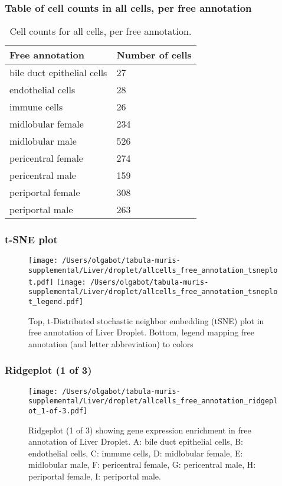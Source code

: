 \subsubsection{Table of cell counts in all cells, per free annotation}\begin{table}[h]
\centering
\label{my-label}
\begin{tabular}{@{}ll@{}}
\toprule

Free annotation& Number of cells \\ \midrule
bile duct epithelial cells & 27 \\

endothelial cells & 28 \\

immune cells & 26 \\

midlobular female & 234 \\

midlobular male & 526 \\

pericentral female & 274 \\

pericentral male & 159 \\

periportal female & 308 \\

periportal male & 263 \\
\bottomrule
\end{tabular}
\caption{Cell counts for all cells, per free annotation.}
\end{table}

\clearpage
\subsubsection{t-SNE plot}
\begin{figure}[h]
\centering
\texttt{[image: /Users/olgabot/tabula-muris-supplemental/Liver/droplet/allcells\_free\_annotation\_tsneplot.pdf]}
\texttt{[image: /Users/olgabot/tabula-muris-supplemental/Liver/droplet/allcells\_free\_annotation\_tsneplot\_legend.pdf]}
\caption{Top, t-Distributed stochastic neighbor embedding (tSNE) plot  in free annotation of Liver Droplet. Bottom, legend mapping free annotation (and letter abbreviation) to colors}
\end{figure}


\clearpage
\clearpage
\subsubsection{Ridgeplot (1 of 3)}
\begin{figure}[h]
\centering
\texttt{[image: /Users/olgabot/tabula-muris-supplemental/Liver/droplet/allcells\_free\_annotation\_ridgeplot\_1-of-3.pdf]}

\caption{ Ridgeplot (1 of 3)  showing gene expression enrichment in free annotation of Liver Droplet. A: bile duct epithelial cells, B: endothelial cells, C: immune cells, D: midlobular female, E: midlobular male, F: pericentral female, G: pericentral male, H: periportal female, I: periportal male.}
\end{figure}


